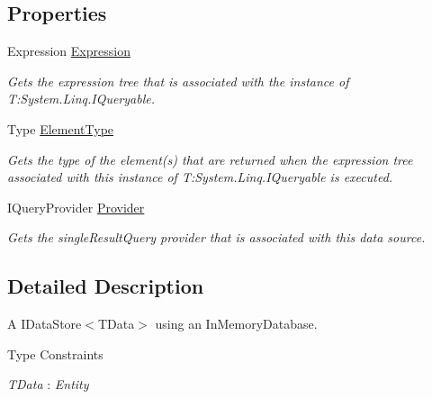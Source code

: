 \subsection*{Properties}
\begin{DoxyCompactItemize}
\item 
Expression \hyperlink{classCqrs_1_1DataStores_1_1InProcessDataStore_a459174c411a0df2b4ec1e48a3b36f884_a459174c411a0df2b4ec1e48a3b36f884}{Expression}
\begin{DoxyCompactList}\small\item\em Gets the expression tree that is associated with the instance of T\+:\+System.\+Linq.\+I\+Queryable. \end{DoxyCompactList}\item 
Type \hyperlink{classCqrs_1_1DataStores_1_1InProcessDataStore_aacc8434efa0250be78dda57e159a5aa8_aacc8434efa0250be78dda57e159a5aa8}{Element\+Type}
\begin{DoxyCompactList}\small\item\em Gets the type of the element(s) that are returned when the expression tree associated with this instance of T\+:\+System.\+Linq.\+I\+Queryable is executed. \end{DoxyCompactList}\item 
I\+Query\+Provider \hyperlink{classCqrs_1_1DataStores_1_1InProcessDataStore_a9f4e487d52f69245266afdf303d585c1_a9f4e487d52f69245266afdf303d585c1}{Provider}
\begin{DoxyCompactList}\small\item\em Gets the single\+Result\+Query provider that is associated with this data source. \end{DoxyCompactList}\end{DoxyCompactItemize}


\subsection{Detailed Description}
A I\+Data\+Store$<$\+T\+Data$>$ using an In\+Memory\+Database. 

\begin{Desc}
\item[Type Constraints]\begin{description}
\item[{\em T\+Data} : {\em Entity}]\end{description}
\end{Desc}


